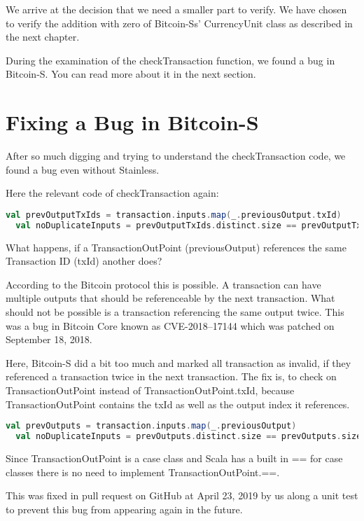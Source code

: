 We arrive at the decision that we need a smaller part to verify.
We have chosen to verify the addition with zero of Bitcoin-Ss' CurrencyUnit class as described in the next chapter.

During the examination of the checkTransaction function, we found a bug in Bitcoin-S.
You can read more about it in the next section.


\section{Fixing a Bug in Bitcoin-S}

After so much digging and trying to understand the checkTransaction code, we found a bug even without Stainless.

Here the relevant code of checkTransaction again:
\begin{lstlisting}[language=scala]
  val prevOutputTxIds = transaction.inputs.map(_.previousOutput.txId)
  val noDuplicateInputs = prevOutputTxIds.distinct.size == prevOutputTxIds.size
\end{lstlisting}

What happens, if a TransactionOutPoint (previousOutput) references the same Transaction ID (txId) another does?

According to the Bitcoin protocol this is possible.
A transaction can have multiple outputs that should be referenceable by the next transaction.
What should not be possible is a transaction referencing the same output twice.
This was a bug in Bitcoin Core known as CVE-2018–17144 which was patched on September 18, 2018.

Here, Bitcoin-S did a bit too much and marked all transaction as invalid, if they referenced a transaction twice in the next transaction.
The fix is, to check on TransactionOutPoint instead of TransactionOutPoint.txId, because TransactionOutPoint contains the txId as well as the output index it references.
\begin{lstlisting}[language=scala]
  val prevOutputs = transaction.inputs.map(_.previousOutput)
  val noDuplicateInputs = prevOutputs.distinct.size == prevOutputs.size
\end{lstlisting}
Since TransactionOutPoint is a case class and Scala has a built in == for case classes there is no need to implement TransactionOutPoint.==.

This was fixed in pull request  on GitHub at April 23, 2019 by us along a unit test to prevent this bug from appearing again in the future.
